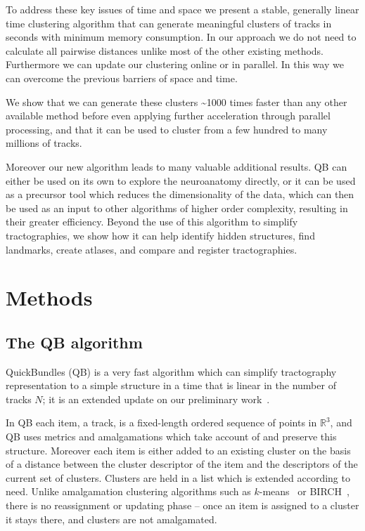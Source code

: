\documentclass[journal]{IEEEtran}
\begin{document}
To address these key issues of time and space we present a stable,
generally linear time clustering algorithm that can generate meaningful
clusters of tracks in seconds with minimum memory consumption. In our
approach we do not need to calculate all pairwise distances unlike most
of the other existing methods. Furthermore we can update our clustering
online or in parallel. In this way we can overcome the previous barriers
of space and time.

We show that we can generate these clusters \textasciitilde1000 times faster than
any other available method before even applying further
acceleration through parallel processing, and that it can be used to
cluster from a few hundred to many millions of tracks.

Moreover our new algorithm leads to many valuable additional results. QB
can either be used on its own to explore the neuroanatomy directly, or
it can be used as a precursor tool which reduces the dimensionality of
the data, which can then be used as an input to other algorithms of
higher order complexity, resulting in their greater efficiency. Beyond
the use of this algorithm to simplify tractographies, we show how it can
help identify hidden structures, find landmarks, create atlases, and
compare and register tractographies.

\section{Methods}

\subsection{The QB algorithm\label{sub:QB-description}}

QuickBundles (QB) is a very fast algorithm which can simplify
tractography representation to a simple structure in a time that is
linear in the number of tracks $N$; it is an extended update on our
preliminary work~\cite{EGMB10}.

In QB each item, a track, is a fixed-length ordered sequence of points
in $\mathbb{R}^{3}$, and QB uses metrics and amalgamations which take
account of and preserve this structure.  Moreover each item is either
added to an existing cluster on the basis of a distance between the
cluster descriptor of the item and the descriptors of the current set of
clusters. Clusters are held in a list which is extended according to
need. Unlike amalgamation clustering algorithms such as
$k$-means~\cite{steinhaus1956division, macqueen1967some} or
BIRCH~\cite{zhang1997birch}, there is no reassignment or updating phase
-- once an item is assigned to a cluster it stays there, and clusters
are not amalgamated.
\end{document}
